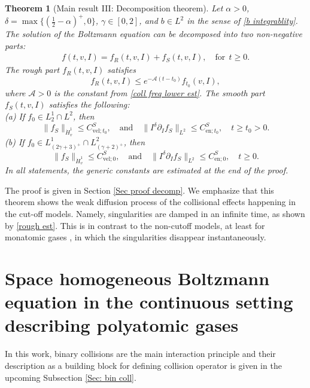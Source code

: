 \documentclass[11pt,a4paper]{amsart}
\newcommand{\g}{\gamma}
\newcommand{\mA}{\mathcal{A}}
\newcommand{\fR}{f_R}
\newcommand{\fS}{f_S}
\newcommand{\CveltS}{C_{\text{vel};t_0}^{S}}
\newcommand{\CenttS}{C_{\text{en};t_0}^{S}}
\newcommand{\CvelzS}{C_{\text{vel};0}^{S}}
\newcommand{\CenzS}{C_{\text{en};0}^{S}}
\newtheorem{theorem}{Theorem}
\begin{document}
\begin{theorem}[Main result III: Decomposition theorem]\label{Th decomp} Let $\alpha>0$, $\delta=\max\{ \left(\frac{1}{2} - \alpha\right)^+,0\}$,  $\g \in [0,2]$, and $b\in L^2$  in the sense of \eqref{b integrablity}. The solution of the Boltzmann equation can be decomposed into two non-negative parts:
	\begin{equation}\label{f decomposed}
		\begin{split}
			f(t,v,I)  = \fR(t,v,I) + \fS(t,v,I), \quad \text{for} \ \  t\geq  0.
		\end{split}
	\end{equation}
The rough part $\fR(t,v,I)$ satisfies
\begin{equation}\label{rough est}
	\fR(t,v,I)  \leq e^{-\mA (t-t_0)} f_{t_0}(v,I), 
\end{equation}
where $\mA >0$ is the constant from \eqref{coll freq lower est}.
The smooth part $	\fS(t,v,I)$ satisfies the following: \\
(a) If $f_0 \in L^1_2 \cap L^2$, then
\begin{equation}\label{fS gen}
	\| 	 	\fS \|_{ \dot{H}^1_v } \leq \CveltS, \quad \text{and} \quad		\| 	I^\delta \partial_{I}	\fS \|_{L^2} \leq \CenttS, \quad t \geq t_0>0.
\end{equation} 
(b) If  $f_0 \in L^1_{(2\g+3)^+} \cap L^2_{(\g+2)^+}$, then  
\begin{equation}\label{fS prop}
	\| 	 	\fS \|_{ \dot{H}^1_v } \leq \CvelzS, \quad \text{and} \quad		\| 	I^\delta \partial_{I}	\fS \|_{L^2} \leq \CenzS, \quad t\geq  0.
\end{equation}
In all statements, the  generic constants are  estimated at the end of the proof.
\end{theorem}
The proof is given in Section \ref{Sec proof decomp}. We emphasize that this theorem
shows the weak diffusion process of the collisional effects happening in the cut-off models.  Namely, singularities are damped in an infinite time, as shown by \eqref{rough est}. This is in contrast to the non-cutoff models, at least for monatomic gases \cite{non-cut}, in which the singularities disappear instantaneously.  

 \section{Space homogeneous Boltzmann equation in the continuous  setting describing polyatomic gases }
 
 
 In this work, binary collisions are the main interaction principle and their description as a building block for defining collision operator is given in the upcoming Subsection \ref{Sec: bin coll}.
 
\end{document}

